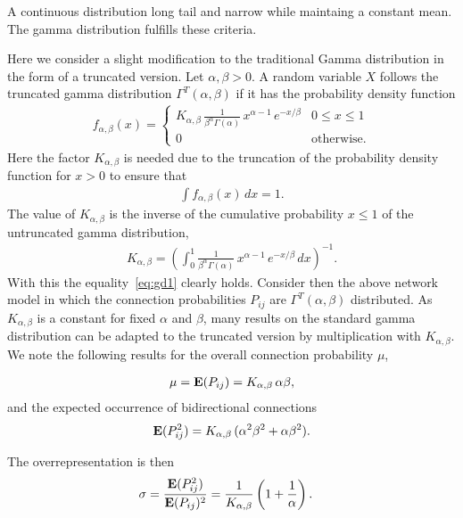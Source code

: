 
A continuous distribution  long tail and narrow while maintaing a constant mean. The gamma distribution fulfills these criteria.

Here we consider a slight modification to the traditional Gamma distribution in the form of a truncated version. Let $\alpha, \beta > 0$. A random variable $X$ follows the truncated gamma distribution $\Gamma^T(\alpha, \beta)$ if it has the probability density function 
%
\begin{align}
  f_{\alpha,\beta}(x) = \begin{cases} K_{\alpha, \beta}\,
\frac{1}{\beta^{\alpha}\Gamma(\alpha)}\, x^{\alpha-1}\,e^{-x/\beta} & 0 \leq x \leq 1 \\
0 & \text{otherwise}.
\end{cases}
\end{align}
%
Here the factor $K_{\alpha,\beta}$ is needed due to the truncation of the probability density function for $x>0$ to ensure that
\begin{align}
  \int f_{\alpha,\beta}(x) \,dx = 1. \label{eq:gd1}
\end{align}
The value of $K_{\alpha,\beta}$ is the inverse of the cumulative probability $x \leq 1$ of the untruncated gamma distribution,
\begin{align}
  K_{\alpha,\beta} = \left(\int_0^{1} \frac{1}{\beta^{\alpha}\Gamma(\alpha)}\, x^{\alpha-1}\,e^{-x/\beta} \, dx \right)^{-1}.
\end{align}
With this the equality~\eqref{eq:gd1} clearly holds. Consider then the above network model in which the connection probabilities $P_{ij}$ are $\Gamma^T(\alpha, \beta)$ distributed. As $K_{\alpha,\beta}$ is a constant for fixed $\alpha$ and $\beta$, many results on the standard gamma distribution can be adapted to the truncated version by multiplication with $K_{\alpha,\beta}$. We note the following results for the overall connection probability $\mu$,

\begin{align}
 \mu = \operatorname{\mathbf{E}}(P_{ij}) = K_{\alpha,\beta} \, \alpha \beta,
\end{align}
and the expected occurrence of bidirectional connections
\begin{align}
  \operatorname{\mathbf{E}}(P_{ij}^2) = K_{\alpha,\beta} \, (\alpha^2 \beta^2 + \alpha \beta^2).
\end{align}

The overrepresentation is then
\begin{align}
  \sigma & = \frac{\E(P_{ij}^2)}{\E(P_{ij})^2} =%
 \frac{1}{K_{\alpha,\beta}} \left(1 + \frac{1}{\alpha}\right).
\end{align}


